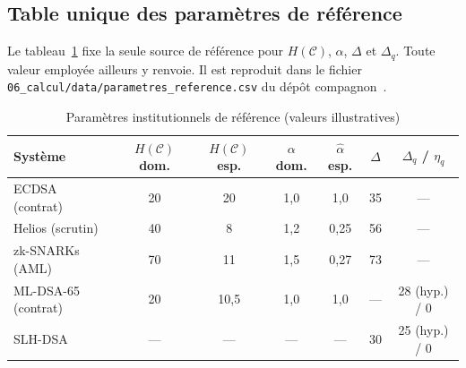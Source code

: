 \begin{sloppypar}
\subsection{Table unique des param\`etres de r\'ef\'erence}
\label{subsec:parametres_reference}

Le tableau~\ref{tab:parametres_reference} fixe la seule source de r\'ef\'erence
pour $H(\mathcal{C})$, $\alpha$, $\Delta$ et $\Delta_q$. Toute valeur employ\'ee
ailleurs y renvoie. Il est reproduit dans le fichier
\texttt{06\_calcul/data/parametres\_reference.csv} du d\'ep\^ot
compagnon~\cite{CROTrilemmaDepot}.

\begin{table}[htbp]
\centering
\caption{Param\`etres institutionnels de r\'ef\'erence (valeurs illustratives)}
\label{tab:parametres_reference}
\small
\begin{tabular}{@{}lcccccc@{}}
\toprule
\textbf{Syst\`eme} & $H(\mathcal{C})$ dom. & $H(\mathcal{C})$ esp. & $\alpha$ dom. & $\hat\alpha$ esp. & $\Delta$ & $\Delta_q$ / $\eta_q$ \\
\midrule
ECDSA (contrat) & 20 & 20 & 1{,}0 & 1{,}0 & 35 & --- \\
Helios (scrutin) & 40 & 8 & 1{,}2 & 0{,}25 & 56 & --- \\
zk-SNARKs (AML) & 70 & 11 & 1{,}5 & 0{,}27 & 73 & --- \\
ML-DSA-65 (contrat) & 20 & 10{,}5 & 1{,}0 & 1{,}0 & --- & 28 (hyp.) / $0$ \\
SLH-DSA & --- & --- & --- & --- & 30 & 25 (hyp.) / $0$ \\
\bottomrule
\end{tabular}


\end{table}
\end{sloppypar}
